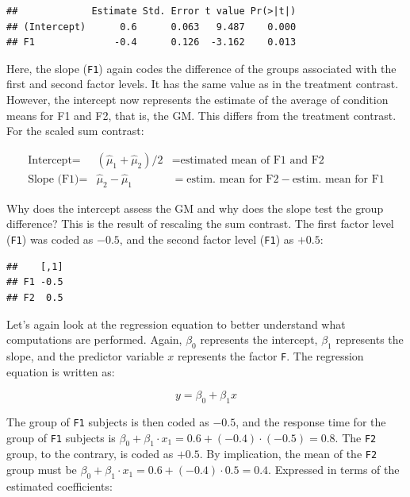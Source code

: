\documentclass[12pt,]{krantz}
\newenvironment{Shaded}{\begin{snugshade}}{\end{snugshade}}
\newcommand{\KeywordTok}[1]{\textcolor[rgb]{0.13,0.29,0.53}{\textbf{#1}}}
\newcommand{\NormalTok}[1]{#1}
\newcommand{\OperatorTok}[1]{\textcolor[rgb]{0.81,0.36,0.00}{\textbf{#1}}}
\begin{document}
\begin{verbatim}
##             Estimate Std. Error t value Pr(>|t|)
## (Intercept)      0.6      0.063   9.487    0.000
## F1              -0.4      0.126  -3.162    0.013
\end{verbatim}

Here, the slope (\texttt{F1}) again codes the difference of the groups associated with the first and second factor levels. It has the same value as in the treatment contrast.
However, the intercept now represents the estimate of the average of condition means for F1 and F2, that is, the GM. This differs from the treatment contrast. For the scaled sum contrast:

\begin{equation}
\begin{array}{lcl}
\text{Intercept} = & (\hat{\mu}_1 + \hat{\mu}_2)/2 & = \text{estimated mean of F1 and F2} \\
\text{Slope (F1)} = & \hat{\mu}_2 - \hat{\mu}_1 & = \text{estim. mean for F2} - \text{estim. mean for F1} 
\end{array}
\label{def:beta2}
\end{equation}

Why does the intercept assess the GM and why does the slope test the group difference? This is the result of rescaling the sum contrast. The first factor level (\texttt{F1}) was coded as \(-0.5\), and the second factor level (\texttt{F1}) as \(+0.5\):

\begin{Shaded}
\end{Shaded}

\begin{verbatim}
##    [,1]
## F1 -0.5
## F2  0.5
\end{verbatim}

Let's again look at the regression equation to better understand what computations are performed. Again, \(\beta_0\) represents the intercept, \(\beta_1\) represents the slope, and the predictor variable \(x\) represents the factor \texttt{F}. The regression equation is written as:

\begin{equation}
y = \beta_0 + \beta_1x
\label{eq:lm2}
\end{equation}

The group of \texttt{F1} subjects is then coded as \(-0.5\), and the response time for the group of \texttt{F1} subjects is \(\beta_0 + \beta_1 \cdot x_1 = 0.6 + (-0.4) \cdot (-0.5) = 0.8\). The \texttt{F2} group, to the contrary, is coded as \(+0.5\). By implication, the mean of the \texttt{F2} group must be \(\beta_0 + \beta_1 \cdot x_1 = 0.6 + (-0.4) \cdot 0.5 = 0.4\).
Expressed in terms of the estimated coefficients:
\end{document}
